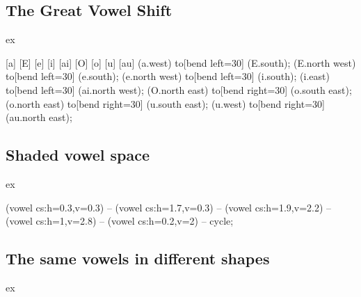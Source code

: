 \documentclass[a4paper,11pt]{article}
\begin{document}
\subsection*{The Great Vowel Shift}

\begin{tcblisting}{ex}
\begin{vowelchart}[width=4cm, plain]
  [a] [E]
  [e] [i]
  [ai]
  [O] [o]
  [u]
  [au]
  \draw[GVC] (a.west) to[bend left=30] (E.south);
  \draw[GVC] (E.north west) to[bend left=30] (e.south);
  \draw[GVC] (e.north west) to[bend left=30] (i.south);
  \draw[GVC] (i.east) to[bend left=30] (ai.north west);
  \draw[GVC] (O.north east) to[bend right=30] (o.south east);
  \draw[GVC] (o.north east) to[bend right=30] (u.south east);
  \draw[GVC] (u.west) to[bend right=30] (au.north east);
\end{vowelchart}
\end{tcblisting}


\subsection*{Shaded vowel space}

\begin{tcblisting}{ex}
\begin{vowelchart}[width=4cm, simple, bg=black!5!white, bgmargin=5pt]
     
     
  \fill[blue, opacity=.12]
  (vowel cs:h=0.3,v=0.3) -- (vowel cs:h=1.7,v=0.3) -- (vowel cs:h=1.9,v=2.2)
  -- (vowel cs:h=1,v=2.8) -- (vowel cs:h=0.2,v=2) -- cycle;
  {
  }
\end{vowelchart}
\end{tcblisting}

\subsection*{The same vowels in different shapes}

\begin{tcblisting}{ex}
\def\demo#1{%
  \begin{vowelchart}[#1, width=3cm]
    \putipavowel{i}
    \putipavowel{u}
  \end{vowelchart}%
}
\demo{rectangle}\\[1em]
\demo{symmetric}\\[1em]
\demo{slanted}
\end{tcblisting}
\end{document}
